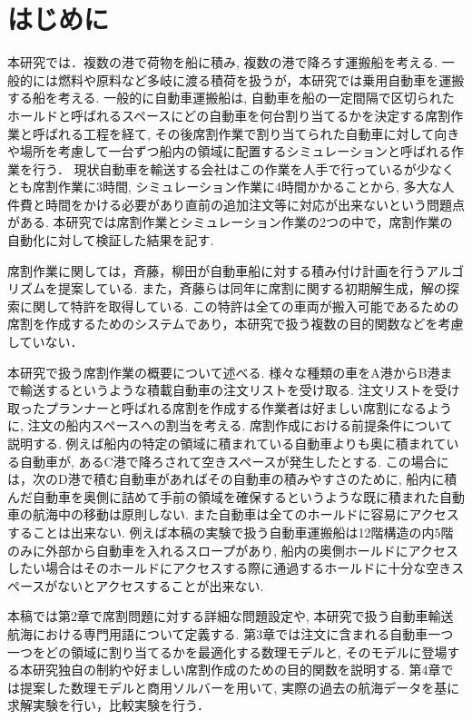 \chapter{はじめに}
本研究では．複数の港で荷物を船に積み, 複数の港で降ろす運搬船を考える. 一般的には燃料や原料など多岐に渡る積荷を扱うが，本研究では乗用自動車を運搬する船を考える. 一般的に自動車運搬船は, 自動車を船の一定間隔で区切られたホールドと呼ばれるスペースにどの自動車を何台割り当てるかを決定する席割作業と呼ばれる工程を経て, その後席割作業で割り当てられた自動車に対して向きや場所を考慮して一台ずつ船内の領域に配置するシミュレーションと呼ばれる作業を行う． 現状自動車を輸送する会社はこの作業を人手で行っているが少なくとも席割作業に3時間, シミュレーション作業に4時間かかることから, 多大な人件費と時間をかける必要があり直前の追加注文等に対応が出来ないという問題点がある\cite{mitsui}. 本研究では席割作業とシミュレーション作業の2つの中で，席割作業の自動化に対して検証した結果を記す.

席割作業に関しては，斉藤，柳田\cite{saito}が自動車船に対する積み付け計画を行うアルゴリズムを提案している. また，斉藤らは同年に席割に関する初期解生成，解の探索に関して特許を取得している\cite{tokkyo}.
この特許は全ての車両が搬入可能であるための席割を作成するためのシステムであり，本研究で扱う複数の目的関数などを考慮していない．

本研究で扱う席割作業の概要について述べる. 様々な種類の車をA港からB港まで輸送するというような積載自動車の注文リストを受け取る. 注文リストを受け取ったプランナーと呼ばれる席割を作成する作業者は好ましい席割になるように, 注文の船内スペースへの割当を考える. 席割作成における前提条件について説明する. 例えば船内の特定の領域に積まれている自動車よりも奥に積まれている自動車が, あるC港で降ろされて空きスペースが発生したとする. この場合には，次のD港で積む自動車があればその自動車の積みやすさのために, 船内に積んだ自動車を奥側に詰めて手前の領域を確保するというような既に積まれた自動車の航海中の移動は原則しない. また自動車は全てのホールドに容易にアクセスすることは出来ない. 例えば本稿の実験で扱う自動車運搬船は12階構造の内5階のみに外部から自動車を入れるスロープがあり, 船内の奥側ホールドにアクセスしたい場合はそのホールドにアクセスする際に通過するホールドに十分な空きスペースがないとアクセスすることが出来ない.

本稿では第2章で席割問題に対する詳細な問題設定や, 本研究で扱う自動車輸送航海における専門用語について定義する.  第3章では注文に含まれる自動車一つ一つをどの領域に割り当てるかを最適化する数理モデルと, そのモデルに登場する本研究独自の制約や好ましい席割作成のための目的関数を説明する. 第4章では提案した数理モデルと商用ソルバーを用いて, 実際の過去の航海データを基に求解実験を行い，比較実験を行う．
